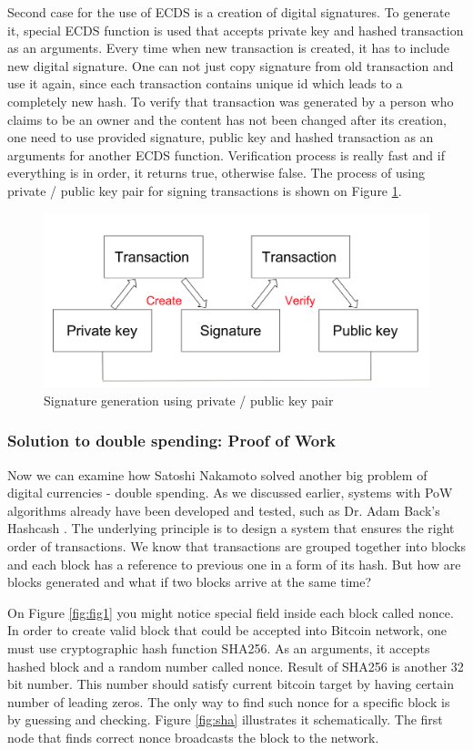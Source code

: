 \documentclass[conference,compsoc]{IEEEtran}
\begin{document}
Second case for the use of ECDS is a creation of digital signatures.
To generate it, special ECDS function is used that accepts private key and hashed transaction as an arguments. 
Every time when new transaction is created, it has to include new digital signature.
One can not just copy signature from old transaction and use it again, since each transaction contains unique id which leads to a completely new hash.  
To verify that transaction was generated by a person who claims to be an owner and the content has not been changed after its creation, one need to use provided signature, public key and hashed transaction as an arguments for another ECDS function. 
Verification process is really fast and if everything is in order, it returns true, otherwise false.
The process of using private / public key pair for signing transactions is shown on Figure \ref{fig:fig2}.

\begin{figure}[h]
  \centering
  \includegraphics[width=.45\textwidth]{graphics/private_public.png}
  \caption{Signature generation using private / public key pair}
  \label{fig:fig2}
\end{figure}

\subsubsection{Solution to double spending: Proof of Work}
Now we can examine how Satoshi Nakamoto solved another big problem of digital currencies - double spending.
As we discussed earlier, systems with PoW algorithms already have been developed and tested, such as Dr. Adam Back's Hashcash \cite{hashcash}. 
The underlying principle is to design a system that ensures the right order of transactions. 
We know that transactions are grouped together into blocks and each block has a reference to previous one in a form of its hash. 
But how are blocks generated and what if two blocks arrive at the same time? 

On Figure \ref{fig:fig1} you might notice special field inside each block called nonce. 
In order to create valid block that could be accepted into Bitcoin network, one must use cryptographic hash function SHA256. 
As an arguments, it accepts hashed block and a random number called nonce.
Result of SHA256 is another 32 bit number. 
This number should satisfy current bitcoin target by having certain number of leading zeros. 
The only way to find such nonce for a specific block is by guessing and checking. 
Figure \ref{fig:sha} illustrates it schematically.
The first node that finds correct nonce broadcasts the block to the network. 
\end{document}
